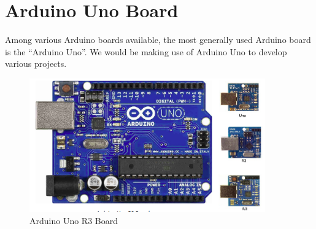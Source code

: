 \begin{figure}[htp]
\end{figure}
\section{Arduino Uno Board}
Among various Arduino boards available, the most generally used Arduino board is the “Arduino Uno”. We would be making use of Arduino Uno to develop various projects.\\

\begin{figure}
    \centering
    \includegraphics[width=4in]{Chapters/images/arduinor3.png}
    \caption{Arduino Uno R3 Board}
    \label{fig:my_label}
    
\end{figure}
